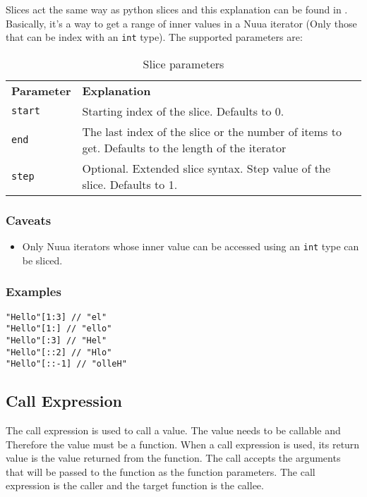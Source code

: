 Slices act the same way as python slices and this explanation can be found in \autocite{python_right_way}. Basically, it's a way to
get a range of inner values in a Nuua iterator (Only those that can be index with an \texttt{int} type).
The supported parameters are:

\begin{table}[H]
    \centering
    \begin{tabular}{ l p{7.5cm} }
        \textbf{Parameter} & \textbf{Explanation} \\
        \texttt{start} & Starting index of the slice. Defaults to 0.\\
        \texttt{end} & The last index of the slice or the number of items to get. Defaults to the length of the iterator\\
        \texttt{step} & Optional. Extended slice syntax. Step value of the slice. Defaults to 1.\\
    \end{tabular}
    \caption{Slice parameters}
    \label{fig:slice_parameters}
\end{table}

\subsubsection{Caveats}

\begin{itemize}
    \item Only Nuua iterators whose inner value can be accessed using an \texttt{int} type can be sliced.
\end{itemize}

\subsubsection{Examples}

\begin{verbatim}
"Hello"[1:3] // "el"
"Hello"[1:] // "ello"
"Hello"[:3] // "Hel"
"Hello"[::2] // "Hlo"
"Hello"[::-1] // "olleH"
\end{verbatim}

\subsection{Call Expression}

The call expression is used to call a value. The value needs to be callable and Therefore the value must be a function.
When a call expression is used, its return value is the value returned from the function. The call accepts the arguments
that will be passed to the function as the function parameters.
The call expression is the caller and the target function is the callee.

